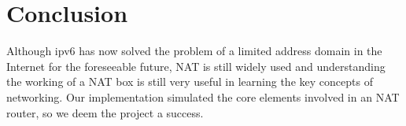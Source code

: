 \documentclass{article}
\begin{document}
\section{Conclusion}

Although ipv6 has now solved the problem of a limited address domain in the Internet for the foreseeable future, NAT is still widely used and understanding the working of a NAT box is still very useful in learning the key concepts of networking.  Our implementation simulated the core elements involved in an NAT router, so we deem the project a success.
\end{document}
